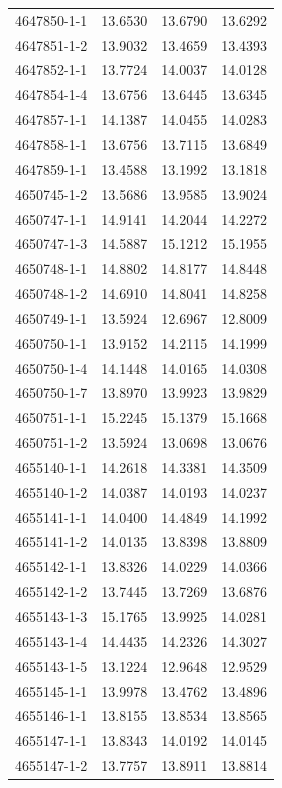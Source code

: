 \begin{longtable}{lrrr}
4647850-1-1 & 13.6530 & 13.6790 & 13.6292 \\
4647851-1-2 & 13.9032 & 13.4659 & 13.4393 \\
4647852-1-1 & 13.7724 & 14.0037 & 14.0128 \\
4647854-1-4 & 13.6756 & 13.6445 & 13.6345 \\
4647857-1-1 & 14.1387 & 14.0455 & 14.0283 \\
4647858-1-1 & 13.6756 & 13.7115 & 13.6849 \\
4647859-1-1 & 13.4588 & 13.1992 & 13.1818 \\
4650745-1-2 & 13.5686 & 13.9585 & 13.9024 \\
4650747-1-1 & 14.9141 & 14.2044 & 14.2272 \\
4650747-1-3 & 14.5887 & 15.1212 & 15.1955 \\
4650748-1-1 & 14.8802 & 14.8177 & 14.8448 \\
4650748-1-2 & 14.6910 & 14.8041 & 14.8258 \\
4650749-1-1 & 13.5924 & 12.6967 & 12.8009 \\
4650750-1-1 & 13.9152 & 14.2115 & 14.1999 \\
4650750-1-4 & 14.1448 & 14.0165 & 14.0308 \\
4650750-1-7 & 13.8970 & 13.9923 & 13.9829 \\
4650751-1-1 & 15.2245 & 15.1379 & 15.1668 \\
4650751-1-2 & 13.5924 & 13.0698 & 13.0676 \\
4655140-1-1 & 14.2618 & 14.3381 & 14.3509 \\
4655140-1-2 & 14.0387 & 14.0193 & 14.0237 \\
4655141-1-1 & 14.0400 & 14.4849 & 14.1992 \\
4655141-1-2 & 14.0135 & 13.8398 & 13.8809 \\
4655142-1-1 & 13.8326 & 14.0229 & 14.0366 \\
4655142-1-2 & 13.7445 & 13.7269 & 13.6876 \\
4655143-1-3 & 15.1765 & 13.9925 & 14.0281 \\
4655143-1-4 & 14.4435 & 14.2326 & 14.3027 \\
4655143-1-5 & 13.1224 & 12.9648 & 12.9529 \\
4655145-1-1 & 13.9978 & 13.4762 & 13.4896 \\
4655146-1-1 & 13.8155 & 13.8534 & 13.8565 \\
4655147-1-1 & 13.8343 & 14.0192 & 14.0145 \\
4655147-1-2 & 13.7757 & 13.8911 & 13.8814 \\

\end{longtable}
